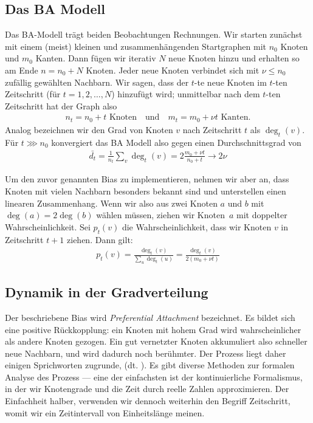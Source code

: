 \subsection{Das BA Modell}
Das  BA-Modell trägt beiden Beobachtungen Rechnungen.
Wir starten zunächst mit einem (meist) kleinen und zusammenhängenden Startgraphen mit $n_0$ Knoten und $m_0$ Kanten.
Dann fügen wir iterativ $N$ neue Knoten hinzu und erhalten so am Ende $n = n_0 + N$ Knoten.
Jeder neue Knoten verbindet sich mit $\nu \le n_0$ zufällig gewählten Nachbarn.
Wir sagen, dass der $t$-te neue Knoten im $t$-ten Zeitschritt (für $t = 1,2, \ldots, N$) hinzufügt wird;
unmittelbar nach dem $t$-ten Zeitschritt hat der Graph also
\begin{align}
    n_t = n_0 + t \text{ Knoten} \quad \text{und} \quad
    m_t = m_0 + \nu t \text{ Kanten}.
\end{align}
Analog bezeichnen wir den Grad von Knoten $v$ nach Zeitschritt $t$ als $\deg_t(v)$.
Für $t \ggg n_0$ konvergiert das BA Modell also gegen einen Durchschnittsgrad von
\begin{align}
    \bar{d_t} = \frac{1}{n_t} \sum_{v} \deg_t(v) = 2 \frac{m_0 + \nu t}{n_0 + t} \to 2 \nu
\end{align}

Um den zuvor genannten Bias zu implementieren, nehmen wir aber an, dass Knoten mit vielen Nachbarn besonders bekannt sind und unterstellen einen linearen Zusammenhang.
Wenn wir also aus zwei Knoten $a$ und $b$ mit $\deg(a) = 2\deg(b)$ wählen müssen, ziehen wir Knoten~$a$ mit doppelter Wahrscheinlichkeit.
Sei $p_t(v)$ die Wahrscheinlichkeit, dass wir Knoten $v$ in Zeitschritt $t + 1$ ziehen.
Dann gilt:
\begin{align}
    p_t(v) = \frac{\deg_t(v)}{\sum_u  \deg_t(u)} = \frac{\deg_t(v)}{2(m_0 + \nu t)}
\end{align}

\subsection{Dynamik in der Gradverteilung}
Der beschriebene Bias wird \emph{Preferential Attachment} bezeichnet.
Es bildet sich eine positive Rückkopplung:
ein Knoten mit hohem Grad wird wahrscheinlicher als andere Knoten gezogen.
Ein gut vernetzter Knoten akkumuliert also schneller neue Nachbarn, und wird dadurch noch berühmter.
Der Prozess liegt daher einigen Sprichworten zugrunde, \zB {} (dt. ).
Es gibt diverse Methoden zur formalen Analyse des Prozess --- eine der einfachsten ist der kontinuierliche Formalismus, in der wir Knotengrade und die Zeit durch reelle Zahlen approximieren.
Der Einfachheit halber, verwenden wir dennoch weiterhin den Begriff Zeitschritt, womit wir ein Zeitintervall von Einheitslänge meinen.

